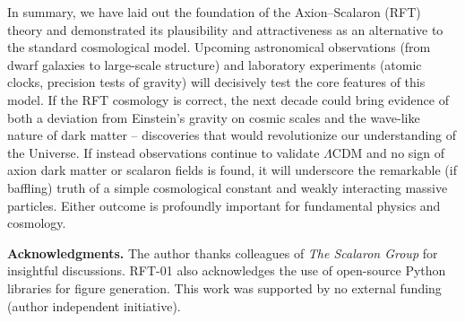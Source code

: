 \documentclass[11pt]{article}
\begin{document}
In summary, we have laid out the foundation of the Axion–Scalaron (RFT) theory and demonstrated its plausibility and attractiveness as an alternative to the standard cosmological model. Upcoming astronomical observations (from dwarf galaxies to large-scale structure) and laboratory experiments (atomic clocks, precision tests of gravity) will decisively test the core features of this model. If the RFT cosmology is correct, the next decade could bring evidence of both a deviation from Einstein’s gravity on cosmic scales and the wave-like nature of dark matter – discoveries that would revolutionize our understanding of the Universe. If instead observations continue to validate $\Lambda$CDM and no sign of axion dark matter or scalaron fields is found, it will underscore the remarkable (if baffling) truth of a simple cosmological constant and weakly interacting massive particles. Either outcome is profoundly important for fundamental physics and cosmology.

\medskip
\noindent \textbf{Acknowledgments.} The author thanks colleagues of \emph{The Scalaron Group} for insightful discussions. RFT-01 also acknowledges the use of open-source Python libraries for figure generation. This work was supported by no external funding (author independent initiative).



\end{document}
